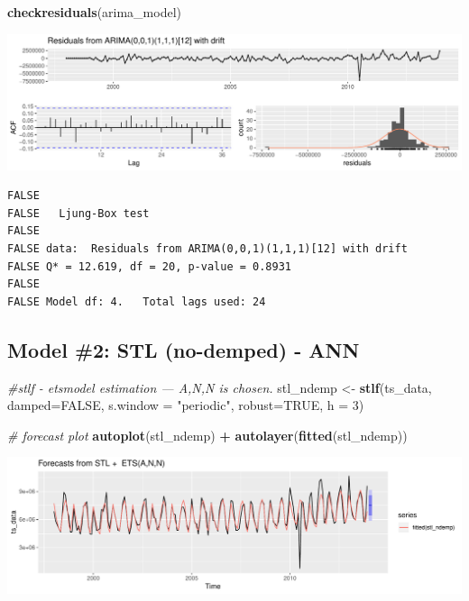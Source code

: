 \documentclass[openany]{book}
\newenvironment{Shaded}{\begin{snugshade}}{\end{snugshade}}
\newcommand{\CommentTok}[1]{\textcolor[rgb]{0.56,0.35,0.01}{\textit{#1}}}
\newcommand{\DataTypeTok}[1]{\textcolor[rgb]{0.13,0.29,0.53}{#1}}
\newcommand{\DecValTok}[1]{\textcolor[rgb]{0.00,0.00,0.81}{#1}}
\newcommand{\KeywordTok}[1]{\textcolor[rgb]{0.13,0.29,0.53}{\textbf{#1}}}
\newcommand{\NormalTok}[1]{#1}
\newcommand{\OperatorTok}[1]{\textcolor[rgb]{0.81,0.36,0.00}{\textbf{#1}}}
\newcommand{\OtherTok}[1]{\textcolor[rgb]{0.56,0.35,0.01}{#1}}
\newcommand{\StringTok}[1]{\textcolor[rgb]{0.31,0.60,0.02}{#1}}
\begin{document}
\begin{Shaded}
\begin{Highlighting}[]
\KeywordTok{checkresiduals}\NormalTok{(arima_model)}
\end{Highlighting}
\end{Shaded}

\includegraphics{Part-B-AS_files/figure-latex/unnamed-chunk-4-2.pdf}

\begin{verbatim}
FALSE 
FALSE   Ljung-Box test
FALSE 
FALSE data:  Residuals from ARIMA(0,0,1)(1,1,1)[12] with drift
FALSE Q* = 12.619, df = 20, p-value = 0.8931
FALSE 
FALSE Model df: 4.   Total lags used: 24
\end{verbatim}

\hypertarget{model-2-stl-no-demped---ann}{%
\subsection{Model \#2: STL (no-demped) -
ANN}\label{model-2-stl-no-demped---ann}}

\begin{Shaded}
\begin{Highlighting}[]
\CommentTok{#stlf - etsmodel estimation --- A,N,N is chosen.}
\NormalTok{stl_ndemp <-}\StringTok{ }\KeywordTok{stlf}\NormalTok{(ts_data, }\DataTypeTok{damped=}\OtherTok{FALSE}\NormalTok{, }\DataTypeTok{s.window =} \StringTok{"periodic"}\NormalTok{, }\DataTypeTok{robust=}\OtherTok{TRUE}\NormalTok{, }\DataTypeTok{h =} \DecValTok{3}\NormalTok{)}

\CommentTok{# forecast plot}
\KeywordTok{autoplot}\NormalTok{(stl_ndemp) }\OperatorTok{+}\StringTok{ }\KeywordTok{autolayer}\NormalTok{(}\KeywordTok{fitted}\NormalTok{(stl_ndemp))}
\end{Highlighting}
\end{Shaded}

\includegraphics{Part-B-AS_files/figure-latex/unnamed-chunk-5-1.pdf}
\end{document}
